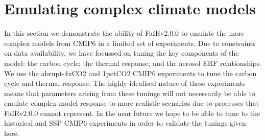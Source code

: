 \documentclass[gmd, manuscript]{copernicus}
\providecommand{\DIFadd}[1]{{\protect\color{blue}#1}} %
\providecommand{\DIFaddbegin}{} %
\providecommand{\DIFaddend}{} %
\begin{document}
\section{Emulating complex climate models} \label{cmip6_tuning}
In this section we demonstrate the ability of FaIRv2.0\DIFaddbegin \DIFadd{.0 }\DIFaddend to emulate the more complex models from CMIP6 \citep{Eyring2016} in a limited set of experiments. Due to constraints on data availability, we have focussed on tuning the key components of the model: the carbon cycle; the thermal response; and the aerosol ERF relationships. We use the abrupt-4xCO2 and 1pctCO2 CMIP6 experiments to tune the carbon cycle and thermal response. The highly idealised nature of these experiments means that parameters arising from these tunings will not necessarily be able to emulate complex model response to more realistic scenarios due to processes that FaIRv2.0\DIFaddbegin \DIFadd{.0 }\DIFaddend cannot represent. In the near future we hope to be able to tune to the historical and SSP CMIP6 experiments in order to validate the tunings given here. 
\end{document}
